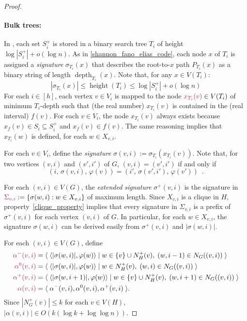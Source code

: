 \documentclass{patmorin}
\makeatletter
\renewcommand{\le}{\leqslant}
\newcommand{\defin}[1]{\emph{\textcolor{brightmaroon}{#1}}}
\def\mathcolor#1#{\@mathcolor{#1}}
\def\@mathcolor#1#2#3{%
  \protect\leavevmode
  \begingroup
    \color#1{#2}#3%
  \endgroup
}
\newcommand{\mathdefin}[1]{\mathcolor{brightmaroon}{#1}}
\DeclareMathOperator{\height}{height}
\DeclareMathOperator{\depth}{depth}
\newcommand{\Oh}{O}
\makeatother
\begin{document}
\begin{proof}
  \paragraph{Bulk trees:}
  In \cite{dujmovic.esperet.ea:adjacency}, each set $S^+_i$ is stored in a binary search tree $T_i$ of height $\log|S^+_i|+o(\log n)$.
  As in \cref{shannon_fano_elias_code}, each node $x$ of $T_i$ is assigned a \defin{signature} \defin{$\sigma_{T_i}(x)$} that describes the root-to-$x$ path $P_{T_i}(x)$ as a binary string of length $\depth_{T_i}(x)$.
  Note that, for any $x\in V(T_i)$:
  \[
    |\sigma_{T_i}(x)| \le \height(T_i) \le \log|S^+_i|+o(\log n)
  \]
  For each $i\in[h]$, each vertex $v\in V_i$ is mapped to the node $\mathdefin{x_{T_i}(v)}\in V(T_i)$ of minimum $T_i$-depth such that (the real number) $x_{T_i}(v)$ is contained in the (real interval) $f(v)$.
  For each $v\in V_i$, the node $x_{T_i}(v)$ always exists because $x_f(v)\in S_i\subseteq S_i^+$ and $x_f(v)\in f(v)$.  The same reasoning implies that $x_{T_i}(w)$ is defined, for each $w\in X_{v,i}$.

  For each $v\in V_i$, define the \defin{signature} $\sigma(v,i):=\sigma_{T_i}(x_{T_i}(v))$.  Note that, for two vertices $(v,i)$ and $(v',i')$ of $G$, $(v,i)=(v',i')$ if and only if
  \begin{equation}
    (i,\,\sigma(v,i),\,\varphi(v)) = (i',\,\sigma(v',i'),\,\varphi(v')) \enspace .
    \label{ps_identity}
  \end{equation}

  For each $(v,i)\in V(G)$, the \defin{extended signature} \defin{$\sigma^+(v,i)$} is the signature in $\mathdefin{\Sigma_{v,i}}:=\{\sigma(w,i):w\in X_{v,i}\}$ of maximum length.  Since $X_{v,i}$ is a clique in $H$, property~\ref{clique_property} implies that every signature in $\Sigma_{v,i}$ is a prefix of $\sigma^+(v,i)$ for each vertex $(v,i)$ of $G$.  In particular, for each $w\in X_{v,i}$, the signature $\sigma(w,i)$ can be derived easily from $\sigma^+(v,i)$ and $|\sigma(w,i)|$.

  For each $(v,i)\in V(G)$, define
  \begin{align*}
    \mathdefin{\alpha^{-}(v,i)}
     & = \langle\; \langle |\sigma(w,i)|, \varphi(w)\rangle \mid w\in \{v\}\cup N^+_H(v),\; (w,i-1)\in N_G((v,i)) \;\rangle   \\
    \mathdefin{\alpha^{0}(v,i)}
     & = \langle\; \langle |\sigma(w,i)|, \varphi(w)\rangle \mid w\in N^+_H(v),\; (w,i)\in N_G((v,i)) \;\rangle               \\
    \mathdefin{\alpha^+(v,i)}
     & = \langle\; \langle |\sigma(w,i+1)|, \varphi(w)\rangle \mid w\in \{v\}\cup N^+_H(v),\; (w,i+1)\in N_G((v,i)) \;\rangle \\
    \mathdefin{\alpha(v,i)}
     & = \langle\; \alpha^-(v,i),\alpha^0(v,i),\alpha^+(v,i) \;\rangle        .
  \end{align*}
  Since $|N^+_G(v)|\le k$ for each $v\in V(H)$, $|\alpha(v,i)|\in\Oh(k(\log k + \log\log n))$.


\end{proof}
\end{document}
